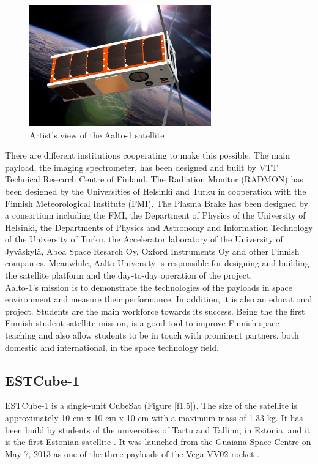 \begin{figure}[H]
\centerline{\includegraphics[width=0.7\textwidth]{images/aalto1.png}}
\caption{Artist's view of the Aalto-1 satellite}
\label{f1.4}
\end{figure}


There are different institutions cooperating to make this possible. The main payload, the imaging spectrometer, has been designed and built by VTT Technical Research Centre of Finland. The Radiation Monitor (RADMON) has been designed by the Universities of Helsinki and Turku in cooperation with the Finnish Meteorological Institute (FMI). The Plasma Brake has been designed by a consortium including the FMI, the Department of Physics of the University of Helsinki, the Departments of Physics and Astronomy and Information Technology of the University of Turku, the Accelerator laboratory of the University of Jyväskylä, Aboa Space Resarch Oy, Oxford Instruments Oy and other Finnish companies. Meanwhile, Aalto University is responsible for designing and building the satellite platform and the day-to-day operation of the project. \cite{AALTO1b}\\ 

Aalto-1's mission is to demonstrate the technologies of the payloads in space environment and measure their performance. In addition, it is also an educational project. Students are the main workforce towards its success. Being the the first Finnish student satellite mission, is a good tool to improve Finnish space teaching and also allow students to be in touch with prominent partners, both domestic and international, in the space technology field.


\subsection{ESTCube-1}

ESTCube-1 is a single-unit CubeSat (Figure \ref{f1.5}). The size of the satellite is approximately 10 cm x 10 cm x 10 cm with a maximum mass of 1.33 kg. It has been build by students of the universities of Tartu and Tallinn, in Estonia, and it is the first Estonian satellite \cite{ESTCube}.
It was launched from the Guaiana Space Centre on May 7, 2013 as one of the three payloads of the Vega VV02 rocket \cite{Arianespace}.\\

